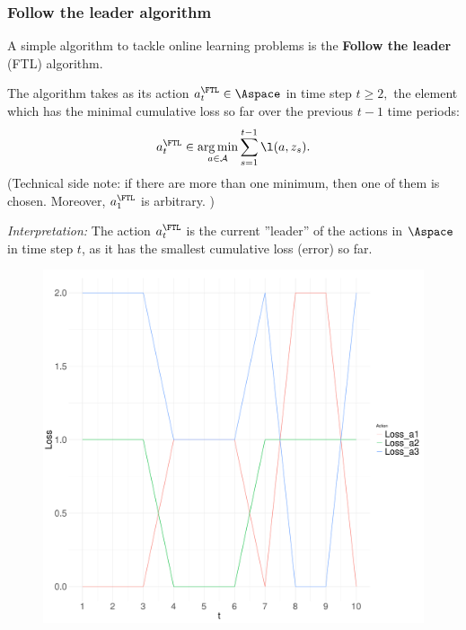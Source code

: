 \documentclass[11pt,compress,t,notes=noshow, xcolor=table]{beamer}
\begin{document}
\begin{frame} 
	\frametitle{Follow the leader algorithm}
	\footnotesize
	\begin{itemize}
		\item A simple algorithm to tackle online learning problems  is the \textbf{Follow the leader} (FTL) algorithm.
		 \item The algorithm takes as its action $a_t^{\FTL} \in \Aspace$ in time step $t \geq 2,$ the element which has the minimal cumulative loss so far over the previous $t-1$ time periods:
		\begin{align*} 
			a_t^{\FTL} \in \argmin_{a \in \mathcal{A}} \sum_{s=1}^{t-1} \l(a,z_s).
		\end{align*}
		{\tiny (Technical side note: if there are more than one minimum, then one of them is chosen. Moreover, $a_1^{\FTL}$ is arbitrary. )}
		\pause
		\begin{minipage}{0.55\textwidth}	
		 \item \emph{Interpretation:} The  action $a_t^{\FTL}$ is the current ''leader'' of the actions in $\Aspace$ in time step $t$, as it has the smallest cumulative loss (error) so far.
	 \end{minipage}
		\begin{minipage}{0.3\textwidth}	
		\begin{figure}
			\centering
			\includegraphics[width=1.2\linewidth]{figure/FTL_illustration}
		\end{figure}
	\end{minipage}
		
	\end{itemize}
\end{frame}
\end{document}
